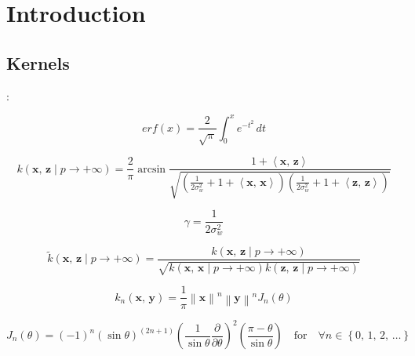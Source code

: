 \section{Introduction}%
\label{sec:introduction}

\subsection{Kernels}
\label{sub:kernels}

\textcite{frenayParameterinsensitiveKernelExtreme2011,williamsComputationInfiniteNeural1998}:

\begin{equation}\label{eq:erf}
    erf(x) = \frac{2}{\sqrt{\pi}} \int_0^x e^{-t^2} \,dt
\end{equation}

\newcommand{\x}{\mathbf{x}}
\newcommand{\z}{\mathbf{z}}
\newcommand{\y}{\mathbf{y}}

\begin{equation}\label{eq:kernel_asin}
    k(\x,\,\z \mid p \to + \infty)  = \frac{2}{\pi}
    \arcsin \frac{1 + \left\langle \x,\,\z \right\rangle}{\sqrt{
            \left(
                \frac{1}{2\sigma_w^2} + 1 + \left\langle \x,\,\x \right\rangle
            \right)
            \left(
                \frac{1}{2\sigma_w^2} + 1 + \left\langle \z,\,\z \right\rangle
            \right)
    }}
\end{equation}

\begin{equation}
    \gamma = \frac{1}{2\sigma_w^2}
\end{equation}

\begin{equation}\label{eq:normalized}
    \tilde{k}(\x,\,\z \mid p \to + \infty) = \frac{
    k(\x,\,\z \mid p \to + \infty) }{
        \sqrt{
        k(\x,\,\x \mid p \to + \infty)
        k(\z,\,\z \mid p \to + \infty)
        }
}
\end{equation}

\textcite{choLargemarginClassificationInfinite2010}

\begin{equation}\label{eq:kernel_cho}
    k_n(\x,\,\y) = \frac{1}{\pi} \left\lVert \x \right\rVert^n \left\lVert \y \right\rVert^n J_n(\theta)
\end{equation}

\begin{equation}
    J_n(\theta) = (-1)^n \left( \sin \theta \right)^{(2n+1)}
    \left( \frac{1}{\sin \theta} \frac{\partial}{\partial \theta} \right)^2
    \left( \frac{\pi - \theta}{\sin \theta} \right)
    \quad \text{for} \quad \forall n \in \left\{ 0,\,1,\,2,\,\dots \right\}
\end{equation}

